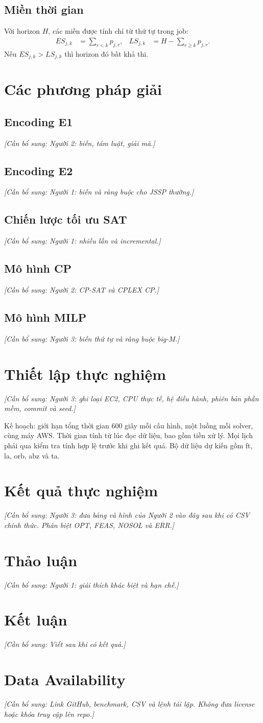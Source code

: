 \documentclass[a4paper,fleqn]{cas-sc}
\newcommand{\todo}[1]{\par\noindent\textit{[Cần bổ sung: #1]}\par}
\begin{document}
\subsection{Miền thời gian}
Với horizon $H$, các miền được tính chỉ từ thứ tự trong job:
\begin{align}
ES_{j,k}&=\sum_{r<k}p_{j,r}, & LS_{j,k}&=H-\sum_{r\geq k}p_{j,r}.
\end{align}
Nếu $ES_{j,k}>LS_{j,k}$ thì horizon đó bất khả thi.
\section{Các phương pháp giải}
\subsection{Encoding E1}\todo{Người 2: biến, tám luật, giải mã.}
\subsection{Encoding E2}\todo{Người 1: biến và ràng buộc cho JSSP thường.}
\subsection{Chiến lược tối ưu SAT}\todo{Người 1: nhiều lần và incremental.}
\subsection{Mô hình CP}\todo{Người 2: CP-SAT và CPLEX CP.}
\subsection{Mô hình MILP}\todo{Người 3: biến thứ tự và ràng buộc big-M.}
\section{Thiết lập thực nghiệm}
\todo{Người 3: ghi loại EC2, CPU thực tế, hệ điều hành, phiên bản phần mềm, commit và seed.}
Kế hoạch: giới hạn tổng thời gian 600 giây mỗi cấu hình, một luồng mỗi solver, cùng máy AWS. Thời gian tính từ lúc đọc dữ liệu, bao gồm tiền xử lý. Mọi lịch phải qua kiểm tra tính hợp lệ trước khi ghi kết quả. Bộ dữ liệu dự kiến gồm ft, la, orb, abz và ta.
\section{Kết quả thực nghiệm}
\todo{Người 3: đưa bảng và hình của Người 2 vào đây sau khi có CSV chính thức. Phân biệt OPT, FEAS, NOSOL và ERR.}
\section{Thảo luận}\todo{Người 1: giải thích khác biệt và hạn chế.}
\section{Kết luận}\todo{Viết sau khi có kết quả.}
\section*{Data Availability}
\todo{Link GitHub, benchmark, CSV và lệnh tái lập. Không đưa license hoặc khóa truy cập lên repo.}
\end{document}
